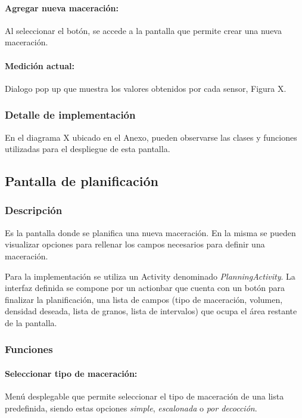                 \paragraph{Agregar nueva maceración:}
                Al seleccionar el botón, se accede a la pantalla que permite crear una nueva maceración.
                \paragraph{Medición actual:}
                Dialogo pop up que muestra los valores obtenidos por cada sensor, Figura X.
            
            \subsubsection{Detalle de implementación}
                En el diagrama X ubicado en el Anexo, pueden observarse las clases y funciones utilizadas para el despliegue de esta pantalla.
                
                
        \subsection{Pantalla de planificación}
        \subsubsection{Descripción}
                \par Es la pantalla donde se planifica una nueva maceración. En la misma se pueden visualizar opciones para rellenar los campos necesarios para definir una maceración.
                
                \par Para la implementación se utiliza un Activity denominado \textit{PlanningActivity}. La interfaz definida se compone por un actionbar que cuenta con un botón para finalizar la planificación, una lista de campos (tipo de maceración, volumen, densidad deseada, lista de granos, lista de intervalos) que ocupa el área restante de la pantalla. 
                
            \subsubsection{Funciones}
                \paragraph{Seleccionar tipo de maceración:}
                Menú desplegable que permite seleccionar el tipo de maceración de una lista predefinida, siendo estas opciones \textit{simple}, \textit{escalonada} o \textit{por decocción}.
                
